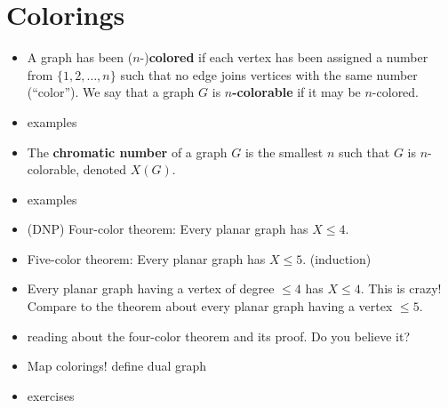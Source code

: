 \section{Colorings}\label{sec:colorings}

\begin{itemize}
    \item A graph has been ($n$-)\textbf{colored} if each vertex has been assigned a number from $\{1, 2, \ldots, n\}$ such that no edge joins vertices with the same number (``color'').  We say that a graph $G$ is \textbf{$n$-colorable} if it may be $n$-colored.
    \item examples
    \item The \textbf{chromatic number} of a graph $G$ is the smallest $n$ such that $G$ is $n$-colorable, denoted $X(G)$.
    \item examples
    \item (DNP) Four-color theorem: Every planar graph has $X \leq 4$.
    \item Five-color theorem: Every planar graph has $X \leq 5$. (induction)
    \item Every planar graph having a vertex of degree $\leq 4$ has $X\leq 4$.  This is crazy!  Compare to the theorem about every planar graph having a vertex $\leq 5$.
    \item reading about the four-color theorem and its proof.  Do you believe it?
    \item Map colorings!  define dual graph
    \item exercises
\end{itemize}

